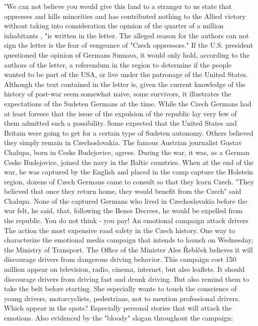 "We can not believe you would give this land to a stranger to us state that oppresses and kills minorities and has contributed nothing to the Allied victory without taking into consideration the opinion of the quarter of a million inhabitants , "is written in the letter.
The alleged reason for the authors can not sign the letter is the fear of vengeance of "Czech oppressors."
If the U.S. president questioned the opinion of Germans Sumava, it would only hold, according to the authors of the letter, a referendum in the region to determine if the people wanted to be part of the USA, or live under the patronage of the United States.
Although the text contained in the letter is, given the current knowledge of the history of post-war seem somewhat naive, some survivors, it illustrates the expectations of the Sudeten Germans at the time.
While the Czech Germans had at least foresee that the issue of the expulsion of the republic lay very few of them admitted such a possibility.
Some expected that the United States and Britain were going to get for a certain type of Sudeten autonomy.
Others believed they simply remain in Czechoslovakia.
The famous Austrian journalist Gustav Chalupa, born in Ceske Budejovice, agrees.
During the war, it was, as a German Ceske Budejovice, joined the navy in the Baltic countries.
When at the end of the war, he was captured by the English and placed in the camp capture the Holstein region, dozens of Czech Germans came to consult so that they learn Czech.
"They believed that once they return home, they would benefit from the Czech" said Chalupa.
None of the captured Germans who lived in Czechoslovakia before the war felt, he said, that, following the Benes Decrees, he would be expelled from the republic.
You do not think - you pay!
An emotional campaign attack drivers
The action the most expensive road safety in the Czech history.
One way to characterize the emotional media campaign that intends to launch on Wednesday, the Ministry of Transport.
The Office of the Minister Ales Řebíček believes it will discourage drivers from dangerous driving behavior.
This campaign cost 150 million appear on television, radio, cinema, internet, but also leaflets.
It should discourage drivers from driving fast and drunk driving.
But also remind them to take the belt before starting.
She especially wants to touch the conscience of young drivers, motorcyclists, pedestrians, not to mention professional drivers.
Which appear in the spots?
Especially personal stories that will attack the emotions.
Also evidenced by the "bloody" slogan throughout the campaign:
